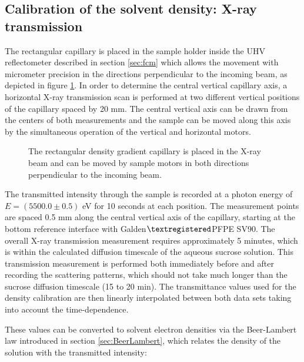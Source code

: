\subsection{Calibration of the solvent density: X-ray transmission}
\label{sec:SolventCalibration}
The rectangular capillary is placed in the sample holder inside the UHV reflectometer described in section \ref{sec:fcm} which allows the movement with micrometer precision in the directions perpendicular to the incoming beam, as depicted in figure \ref{fig:DensityGradientCapillarySetup}. In order to determine the central vertical capillary axis, a horizontal X-ray transmission scan is performed at two different vertical positions of the capillary spaced by 20 mm. The central vertical axis can be drawn from the centers of both measurements and the sample can be moved along this axis by the simultaneous operation of the vertical and horizontal motors.

\begin{figure}%
	\centering
        	\def\svgwidth{0.75\linewidth}
		
		\caption[Contrast variation technique in SAXS with a density gradient capillary.]{The rectangular density gradient capillary is placed in the X-ray beam and can be moved by sample motors in both directions perpendicular to the incoming beam.}
		\label{fig:DensityGradientCapillarySetup}
\end{figure}

The transmitted intensity through the sample is recorded at a photon energy of \(E = (5500.0 \pm  0.5)\) eV for 10 seconds at each position. The measurement points are spaced 0.5 mm along the central vertical axis of the capillary, starting at the bottom reference interface with Galden\(\textregistered\)PFPE SV90. The overall X-ray transmission measurement requires approximately 5 minutes, which is within the calculated diffusion timescale of the aqueous sucrose solution. This transmission measurement is performed both immediately before and after recording the scattering patterns, which should not take much longer than the sucrose diffusion timescale (15 to 20 min). The transmittance values used for the density calibration are then linearly interpolated between both data sets taking into account the time-dependence. 

These values can be converted to solvent electron densities via the Beer-Lambert law introduced in section \ref{sec:BeerLambert}, which relates the density of the solution with the transmitted intensity:


